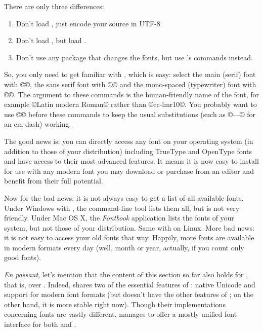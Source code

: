 \documentclass{lltxdoc}
\begin{document}
There are only three differences:
\begin{enumerate}
  \item Don't load , just encode your source in UTF-8.
  \item Don't load , but load .
  \item Don't use any package that changes the fonts, but use 's
    commands instead.
\end{enumerate}
So, you only need to get familiar with , which is
easy: select the main (serif) font with ©\setmainfont©, the sans serif font
with ©\setsansfont© and the mono-spaced (typewriter) font with ©\setmonofont©.
The argument to these commands is the human-friendly name of the font, for
example ©Latin modern Roman© rather than ©ec-lmr10©. You probably want to use
©© before these commands to keep the usual
\tex substitutions (such as ©---© for an em-dash) working.

The good news is: you can directly access any font on your operating system
(in addition to those of your \tex distribution) including TrueType and
OpenType fonts and have access to their most advanced features. It means it
is now easy to install for use with \lualatex any modern font you may download
or purchase from an editor and benefit from their full potential.

Now for the bad news: it is not always easy to get a list of all available
fonts. Under Windows with \texlive, the command-line tool  lists
them all, but is not very friendly. Under Mac OS X, the \emph{Fontbook}
application lists the fonts of your system, but not those of your
distribution. Same with  on Linux. More bad news: it is not easy
to access your old fonts that way. Happily, more fonts are available in modern
formats every day (well, month or year, actually, if you count only good
fonts).

\emph{En passant}, let's mention that the content of this section so far also
holds for \xelatex, that is, \latex over \xetex. Indeed, \xetex shares two of
the essential features of \luatex: native Unicode and support for modern font
formats (but doesn't have the other features of \luatex; on the other hand, it
is more stable right now). Though their implementations concerning fonts are
vastly different,  manages to offer a mostly unified font
interface for both \xelatex and \lualatex.

\medskip
\end{document}
